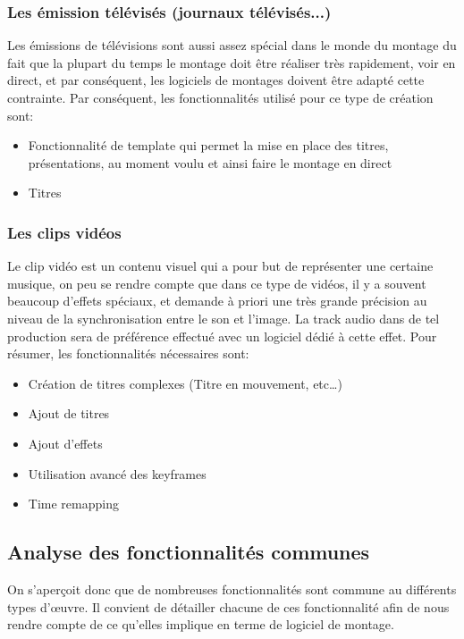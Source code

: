     \subsubsection {Les émission télévisés (journaux télévisés...)}
      Les émissions de télévisions sont aussi assez spécial dans le monde du montage
      du fait que la plupart du temps le montage doit être réaliser très rapidement,
      voir en direct, et par conséquent, les logiciels de montages doivent être
      adapté cette contrainte. Par conséquent, les fonctionnalités utilisé pour
      ce type de création sont:
      \begin{itemize}
        \item{Fonctionnalité de template qui permet la mise en place des titres,
              présentations, au moment voulu et ainsi faire le montage en direct}
        \item{Titres}
      \end{itemize}

    \subsubsection {Les clips vidéos}
      Le clip vidéo est un contenu visuel qui a pour but de représenter
      une certaine musique, on peu se rendre compte que dans ce type de
      vidéos, il y a souvent beaucoup d'effets spéciaux, et demande à
      priori une très grande précision au niveau de la synchronisation
      entre le son et l'image. La track audio dans de tel production
      sera de préférence effectué avec un logiciel dédié à cette
      effet. Pour résumer, les fonctionnalités nécessaires sont:
      \begin{itemize}
        \item{Création de titres complexes (Titre en mouvement, etc\ldots)}
        \item{Ajout de titres}
        \item{Ajout d'effets}
        \item{Utilisation avancé des keyframes}
        \item{Time remapping}
      \end{itemize}

  \subsection{Analyse des fonctionnalités communes}
    On s'aperçoit donc que de nombreuses fonctionnalités sont commune au différents
    types d'œuvre. Il convient de détailler chacune de ces fonctionnalité afin de
    nous rendre compte de ce qu'elles implique en terme de logiciel de montage.


